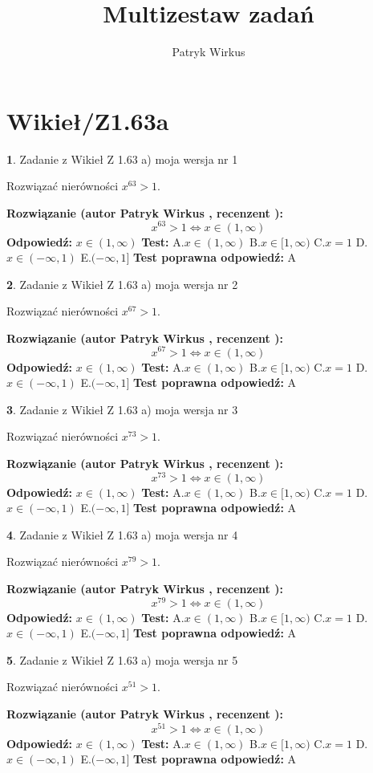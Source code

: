 \documentclass[12pt, a4paper]{article}
\title{Multizestaw zadań}
\author{Patryk Wirkus}
\date{}
\theoremstyle{definition} %
\newtheorem{zad}{}
\newcommand{\kategoria}[1]{\section{#1}}
\newcommand{\zadStart}[1]{\begin{zad}#1\newline}
\newcommand{\zadStop}{\end{zad}}
\newcommand{\rozwStart}[2]{\noindent \textbf{Rozwiązanie (autor #1 , recenzent #2): }\newline}
\newcommand{\rozwStop}{\newline}
\newcommand{\odpStart}{\noindent \textbf{Odpowiedź:}\newline}
\newcommand{\odpStop}{\newline}
\newcommand{\testStart}{\noindent \textbf{Test:}\newline}
\newcommand{\testStop}{\newline}
\newcommand{\kluczStart}{\noindent \textbf{Test poprawna odpowiedź:}\newline}
\newcommand{\kluczStop}{\newline}
\begin{document}
\maketitle

\kategoria{Wikieł/Z1.63a}


\zadStart{Zadanie z Wikieł Z 1.63 a) moja wersja nr 1}

Rozwiązać nierówności $x^{63} > 1$.
\zadStop
\rozwStart{Patryk Wirkus}{}
$$x^{63} > 1 \iff x \in (1,\infty)$$
\rozwStop
\odpStart
$x \in (1,\infty)$
\odpStop
\testStart
A.$x \in (1,\infty)$ B.$x \in [1,\infty)$ C.$x = 1$ D.$x \in (-\infty,1)$ E.$(-\infty,1]$
\testStop
\kluczStart
A
\kluczStop



\zadStart{Zadanie z Wikieł Z 1.63 a) moja wersja nr 2}

Rozwiązać nierówności $x^{67} > 1$.
\zadStop
\rozwStart{Patryk Wirkus}{}
$$x^{67} > 1 \iff x \in (1,\infty)$$
\rozwStop
\odpStart
$x \in (1,\infty)$
\odpStop
\testStart
A.$x \in (1,\infty)$ B.$x \in [1,\infty)$ C.$x = 1$ D.$x \in (-\infty,1)$ E.$(-\infty,1]$
\testStop
\kluczStart
A
\kluczStop



\zadStart{Zadanie z Wikieł Z 1.63 a) moja wersja nr 3}

Rozwiązać nierówności $x^{73} > 1$.
\zadStop
\rozwStart{Patryk Wirkus}{}
$$x^{73} > 1 \iff x \in (1,\infty)$$
\rozwStop
\odpStart
$x \in (1,\infty)$
\odpStop
\testStart
A.$x \in (1,\infty)$ B.$x \in [1,\infty)$ C.$x = 1$ D.$x \in (-\infty,1)$ E.$(-\infty,1]$
\testStop
\kluczStart
A
\kluczStop



\zadStart{Zadanie z Wikieł Z 1.63 a) moja wersja nr 4}

Rozwiązać nierówności $x^{79} > 1$.
\zadStop
\rozwStart{Patryk Wirkus}{}
$$x^{79} > 1 \iff x \in (1,\infty)$$
\rozwStop
\odpStart
$x \in (1,\infty)$
\odpStop
\testStart
A.$x \in (1,\infty)$ B.$x \in [1,\infty)$ C.$x = 1$ D.$x \in (-\infty,1)$ E.$(-\infty,1]$
\testStop
\kluczStart
A
\kluczStop



\zadStart{Zadanie z Wikieł Z 1.63 a) moja wersja nr 5}

Rozwiązać nierówności $x^{51} > 1$.
\zadStop
\rozwStart{Patryk Wirkus}{}
$$x^{51} > 1 \iff x \in (1,\infty)$$
\rozwStop
\odpStart
$x \in (1,\infty)$
\odpStop
\testStart
A.$x \in (1,\infty)$ B.$x \in [1,\infty)$ C.$x = 1$ D.$x \in (-\infty,1)$ E.$(-\infty,1]$
\testStop
\kluczStart
A
\kluczStop
\end{document}
